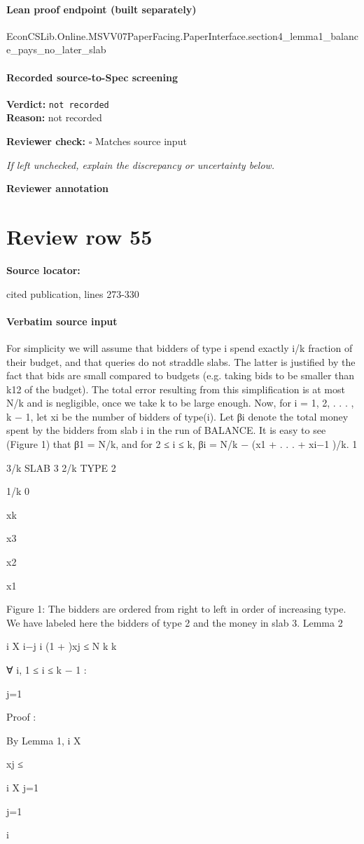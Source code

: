 \documentclass[10pt]{article}
\newcommand{\reviewerbox}{%
  \par\noindent\fbox{\parbox{0.96\linewidth}{\rule{0pt}{0.38in}}}\par
}
\newcommand{\reviewmatch}[1]{%
  \par\noindent\textbf{Reviewer check:} $\square$\; #1\par
  \noindent\emph{If left unchecked, explain the discrepancy or uncertainty below.}\par
}
\begin{document}
\paragraph{Lean proof endpoint (built separately)}\begin{ReviewVerbatim}
EconCSLib.Online.MSVV07PaperFacing.PaperInterface.section4_lemma1_balance_pays_no_later_slab
\end{ReviewVerbatim}

\paragraph{Recorded source-to-Spec screening}
\textbf{Verdict:} \texttt{not recorded}
\\
\textbf{Reason:} not recorded
\reviewmatch{Matches source input}
\noindent\textbf{Reviewer annotation}\par
\reviewerbox
\clearpage
\hypertarget{source-claim-43d0467a1c6009b2}{}
\section*{Review row 55}
\textbf{Source locator:} {\footnotesize\raggedright cited publication, lines 273-\allowbreak{}330\par}
\paragraph{Verbatim source input}
\begin{ReviewVerbatim}
For simplicity we will assume that bidders of type i spend exactly i/k fraction of their budget,
and that queries do not straddle slabs. The latter is justified by the fact that bids are small
compared to budgets (e.g. taking bids to be smaller than k12 of the budget). The total error
resulting from this simplification is at most N/k and is negligible, once we take k to be large
enough. Now, for i = 1, 2, . . . , k − 1, let xi be the number of bidders of type(i). Let βi denote
the total money spent by the bidders from slab i in the run of BALANCE. It is easy to see
(Figure 1) that β1 = N/k, and for 2 ≤ i ≤ k, βi = N/k − (x1 + . . . + xi−1 )/k.
1

3/k
SLAB 3
2/k
TYPE 2

1/k
0

xk

x3

x2

x1

Figure 1: The bidders are ordered from right to left in order of increasing type. We have labeled here
the bidders of type 2 and the money in slab 3.
Lemma 2

i
X
i−j
i
(1 +
)xj ≤ N
k
k

∀ i, 1 ≤ i ≤ k − 1 :

j=1

Proof :

By Lemma 1,
i
X

xj ≤

i
X
j=1

j=1

i
\end{ReviewVerbatim}
\end{document}
